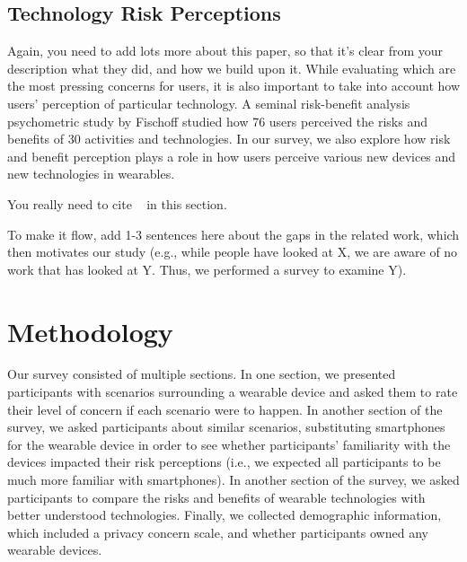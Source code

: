 \documentclass{acm_proc_article-sp}
\begin{document}
\subsection{Technology Risk Perceptions}
{\color{red} Again, you need to add lots more about this paper, so that it's clear from your description what they did, and how we build upon it.}
While evaluating which are the most pressing concerns for users, it is also important to take into account how users' perception of particular technology. A seminal risk-benefit analysis psychometric study by Fischoff \cite{Fischhoff} studied how 76 users perceived the risks and benefits of 30 activities and technologies. In our survey, we also explore how risk and benefit perception plays a role in how users perceive various new devices and new technologies in wearables. 

{\color{red} You really need to cite ~\cite{Denning2014} in this section.}

{\color{red} To make it flow, add 1-3 sentences here about the gaps in the related work, which then motivates our study (e.g., while people have looked at X, we are aware of no work that has looked at Y. Thus, we performed a survey to examine Y).}


\section{Methodology}
Our survey consisted of multiple sections. In one section, we presented participants with scenarios surrounding a wearable device and asked them to rate their level of concern if each scenario were to happen. In another section of the survey, we asked participants about similar scenarios, substituting smartphones for the wearable device in order to see whether participants' familiarity with the devices impacted their risk perceptions (i.e., we expected all participants to be much more familiar with smartphones). In another section of the survey, we asked participants to compare the risks and benefits of wearable technologies with better understood technologies. Finally, we collected demographic information, which included a privacy concern scale, and whether participants owned any wearable devices. 


\end{document}

